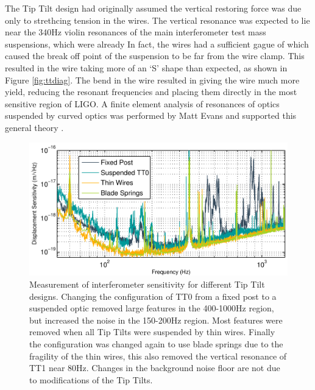 The Tip Tilt design had originally assumed the vertical restoring force was due only to strethcing tension in the wires. %
The vertical resonance was expected to lie near the 340Hz violin resonances of the main interferometer test mass suspensions, which were already In fact, the wires had a sufficient gague of  which caused the break off point of the suspension to be far from the wire clamp. %
This resulted in the wire taking more of an `S' shape than expected, as shown in Figure \ref{fig:ttdiag}. %
The bend in the wire resulted in giving the wire much more yield, reducing the resonant frequencies and placing them directly in the most sensitive region of LIGO. %
A finite element analysis of resonances of optics suspended by curved optics was performed by Matt Evans and supported this general theory \cite{mattfea}.

\begin{figure}
  \begin{center}
  \leavevmode
  \includegraphics{figs-jitter/sensimprovement.pdf}
  \end{center}
  \caption[Measurement of interferometer sensitivity for different Tip Tilt designs.]{Measurement of interferometer sensitivity for different Tip Tilt designs. Changing the configuration of TT0 from a fixed post to a suspended optic removed large features in the 400-1000Hz region, but increased the noise in the 150-200Hz region. Most features were removed when all Tip Tilts were suspended by thin wires. Finally the configuration was changed again to use blade springs due to the fragility of the thin wires, this also removed the vertical resonance of TT1 near 80Hz. Changes in the background noise floor are not due to modifications of the Tip Tilts. }
  \label{fig:sensimprovement}
\end{figure}

